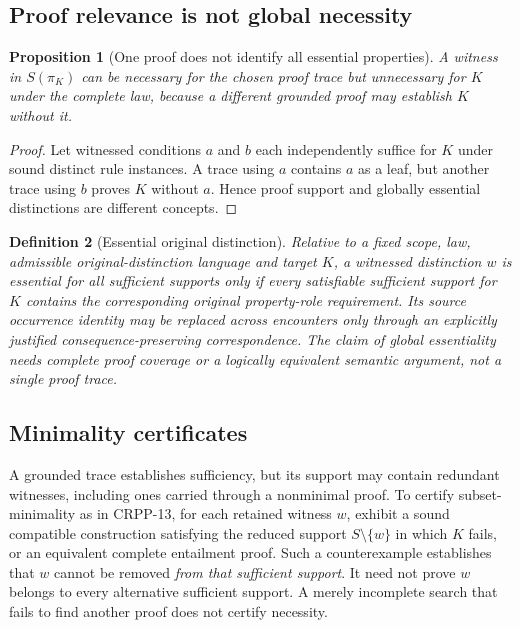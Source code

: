 \documentclass[11pt]{article}
\newtheorem{definition}{Definition}[section]
\newtheorem{proposition}[definition]{Proposition}
\begin{document}
\subsection{Proof relevance is not global necessity}
\begin{proposition}[One proof does not identify all essential properties]
A witness in $S(\pi_K)$ can be necessary for the
chosen proof trace but unnecessary for $K$ under
the complete law, because a different grounded
proof may establish $K$ without it.
\end{proposition}
\begin{proof}
Let witnessed conditions $a$ and $b$ each
independently suffice for $K$ under sound
distinct rule instances. A trace using $a$
contains $a$ as a leaf, but another trace
using $b$ proves $K$ without $a$. Hence
proof support and globally essential
distinctions are different concepts.
\end{proof}

\begin{definition}[Essential original distinction]
Relative to a fixed scope, law, admissible
original-distinction language and target $K$,
a witnessed distinction $w$ is \emph{essential
for all sufficient supports} only if every
satisfiable sufficient support for $K$
contains the corresponding original
property-role requirement. Its source
occurrence identity may be replaced
across encounters only through an explicitly
justified consequence-preserving correspondence.
The claim of global essentiality needs
complete proof coverage or a logically
equivalent semantic argument, not a
single proof trace.
\end{definition}

\subsection{Minimality certificates}
A grounded trace establishes sufficiency, but its
support may contain redundant witnesses, including
ones carried through a nonminimal proof.
To certify subset-minimality as in CRPP-13, for
each retained witness $w$, exhibit a sound
compatible construction satisfying the reduced
support $S\setminus\{w\}$ in which $K$ fails,
or an equivalent complete entailment proof.
Such a counterexample establishes that $w$
cannot be removed \emph{from that sufficient
support}. It need not prove $w$ belongs to
every alternative sufficient support.
A merely incomplete search that fails to find
another proof does not certify necessity.
\end{document}
